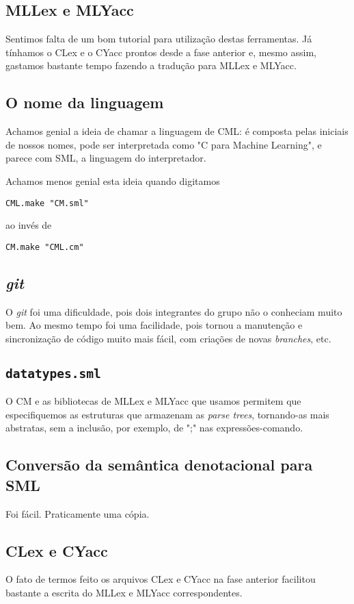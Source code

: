 \documentclass[12pt]{article}
\begin{document}
\subsection{MLLex e MLYacc}
Sentimos falta de um bom tutorial para utilização destas ferramentas. Já tínhamos o CLex e o CYacc prontos desde a fase anterior e, mesmo assim, gastamos bastante tempo fazendo a tradução para MLLex e MLYacc.

\subsection{O nome da linguagem}
Achamos genial a ideia de chamar a linguagem de CML: é composta pelas iniciais de nossos nomes, pode ser interpretada como "C para Machine Learning", e parece com SML, a linguagem do interpretador.

Achamos menos genial esta ideia quando digitamos

\begin{Verbatim}
CML.make "CM.sml"
\end{Verbatim}

ao invés de
\begin{Verbatim}
CM.make "CML.cm"
\end{Verbatim}

\subsection{\textit{git}}
O \textit{git} foi uma dificuldade, pois dois integrantes do grupo não o conheciam muito bem. Ao mesmo tempo foi uma facilidade, pois tornou a manutenção e sincronização de código muito mais fácil, com criações de novas \textit{branches}, etc.

\subsection{\texttt{datatypes.sml}}
O CM e as bibliotecas de MLLex e MLYacc que usamos permitem que especifiquemos as estruturas que armazenam as \textit{parse trees}, tornando-as mais abstratas, sem a inclusão, por exemplo, de ";" nas expressões-comando.

\subsection{Conversão da semântica denotacional para SML}
Foi fácil. Praticamente uma cópia.

\subsection{CLex e CYacc}
O fato de termos feito os arquivos CLex e CYacc na fase anterior facilitou bastante a escrita do MLLex e MLYacc correspondentes.
\end{document}
